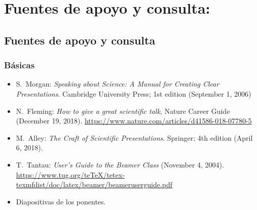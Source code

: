 \section{Fuentes de apoyo y consulta:}

\subsection{Fuentes de apoyo y consulta}

\subsubsection{B\'{a}sicas}

 \begin{itemize}[itemsep=0em]

 \item{S.\ {\sc Morgan}: {\em Speaking about Science: A Manual for
      Creating Clear Presentations}.
    Cambridge University Press; 1st edition (September 1, 2006)}

 \item{N.\ Fleming: {\em How to give a great scientific talk}, Nature Career Guide (December 19, 2018). \url{https://www.nature.com/articles/d41586-018-07780-5}}

 \item{M.\ Alley: {\em The Craft of Scientific Presentations}. Springer; 4th edition (April 6, 2018).}

\item{T.\ Tantau: {\em User's Guide to the Beamer Class} (November 4,
  2004). \url{https://www.tug.org/teTeX/tetex-texmfdist/doc/latex/beamer/beameruserguide.pdf}}
   
\item{Diapositivas de los ponentes.}
   
\end{itemize}


